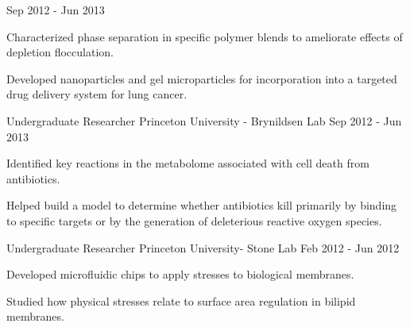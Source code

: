 \begin{cventries}
    {} %
    {Sep 2012 - Jun 2013} %
    {
      \begin{cvitems} %
        \item Characterized phase separation in specific polymer blends to ameliorate effects of depletion flocculation.
        \item Developed nanoparticles and gel microparticles for incorporation into a targeted drug delivery system for lung cancer.
      \end{cvitems}
    }
\ifoutdated
  \cventry
    {Undergraduate Researcher} %
    {Princeton University - Brynildsen Lab} %
    {} %
    {Sep 2012 - Jun 2013} %
    {
      \begin{cvitems} %
        \item Identified key reactions in the \ecoli metabolome associated with cell death from antibiotics.
        \item Helped build a model to determine whether antibiotics kill primarily by binding to specific targets or by the generation of deleterious reactive oxygen species.
      \end{cvitems}
    }
  \cventry
    {Undergraduate Researcher} %
    {Princeton University- Stone Lab} %
    {} %
    {Feb 2012 - Jun 2012} %
    {
      \begin{cvitems} %
        \item Developed microfluidic chips to apply stresses to biological membranes.
        \item Studied how physical stresses relate to surface area regulation in bilipid membranes.
      \end{cvitems}
}
\end{cventries}
